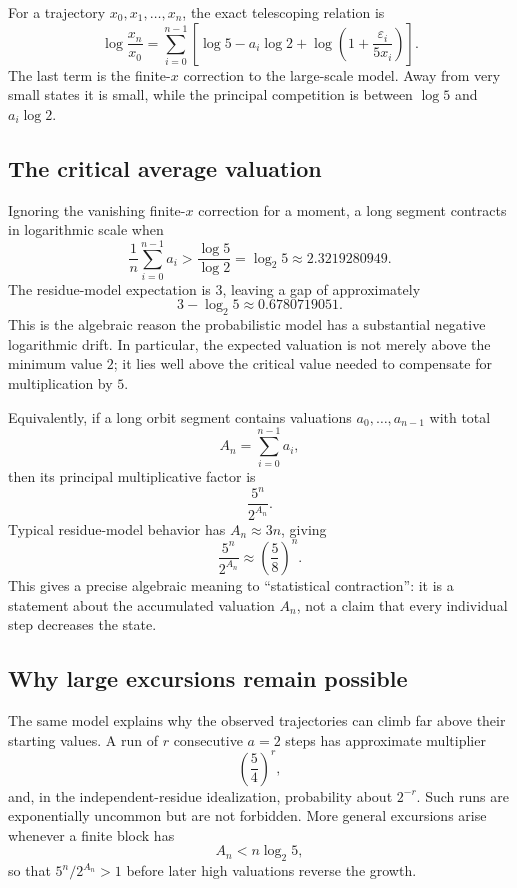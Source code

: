 \documentclass[11pt]{article}
\begin{document}
For a trajectory $x_0,x_1,\ldots,x_n$, the exact telescoping relation is
\begin{equation}
\log\frac{x_n}{x_0}
=
\sum_{i=0}^{n-1}
\left[
\log 5-a_i\log2+
\log\left(1+\frac{\varepsilon_i}{5x_i}\right)
\right].
\label{eq:exactlogsum}
\end{equation}
The last term is the finite-$x$ correction to the large-scale model.  Away from very small states it is small, while the principal competition is between $\log5$ and $a_i\log2$.

\subsection{The critical average valuation}

Ignoring the vanishing finite-$x$ correction for a moment, a long segment contracts in logarithmic scale when
\[
\frac1n\sum_{i=0}^{n-1}a_i
>
\frac{\log5}{\log2}
=\log_2 5
\approx2.3219280949.
\]
The residue-model expectation is $3$, leaving a gap of approximately
\[
3-\log_2 5\approx0.6780719051.
\]
This is the algebraic reason the probabilistic model has a substantial negative logarithmic drift.  In particular, the expected valuation is not merely above the minimum value $2$; it lies well above the critical value needed to compensate for multiplication by $5$.

Equivalently, if a long orbit segment contains valuations $a_0,\ldots,a_{n-1}$ with total
\[
A_n=\sum_{i=0}^{n-1}a_i,
\]
then its principal multiplicative factor is
\[
\frac{5^n}{2^{A_n}}.
\]
Typical residue-model behavior has $A_n\approx3n$, giving
\[
\frac{5^n}{2^{A_n}}\approx\left(\frac58\right)^n.
\]
This gives a precise algebraic meaning to ``statistical contraction'': it is a statement about the accumulated valuation $A_n$, not a claim that every individual step decreases the state.

\subsection{Why large excursions remain possible}

The same model explains why the observed trajectories can climb far above their starting values.  A run of $r$ consecutive $a=2$ steps has approximate multiplier
\[
\left(\frac54\right)^r,
\]
and, in the independent-residue idealization, probability about $2^{-r}$.  Such runs are exponentially uncommon but are not forbidden.  More general excursions arise whenever a finite block has
\[
A_n<n\log_2 5,
\]
so that $5^n/2^{A_n}>1$ before later high valuations reverse the growth.
\end{document}
